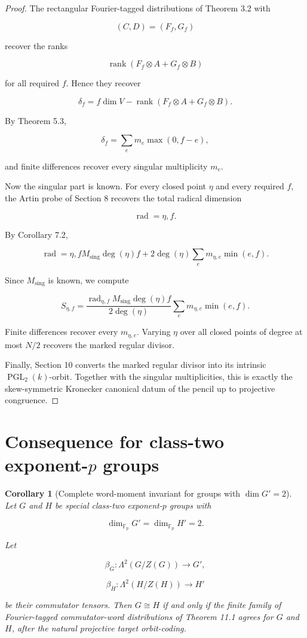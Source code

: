 \documentclass[11pt]{article}
\newtheorem{corollary}[theorem]{Corollary}
\begin{document}
\begin{proof}

The rectangular Fourier-tagged distributions of Theorem 3.2 with

\[
(C,D)=(F_f,G_f)
\]

recover the ranks

\[
\operatorname{rank}(F_f\otimes A+G_f\otimes B)
\]

for all required $f$. Hence they recover

\[
\delta_f
=
f\dim V-\operatorname{rank}(F_f\otimes A+G_f\otimes B).
\]

By Theorem 5.3,

\[
\delta_f=\sum_e m_e\max(0,f-e),
\]

and finite differences recover every singular multiplicity $m_e$.

Now the singular part is known. For every closed point $\eta$ and every required $f$, the Artin probe of Section 8 recovers the total radical dimension

\[
\operatorname{rad}
=
{\eta,f}.
\]

By Corollary 7.2,

\[
\operatorname{rad}
=
{\eta,f}
M_{\mathrm{sing}}\deg(\eta)f
+
2\deg(\eta)\sum_e m_{\eta,e}\min(e,f).
\]

Since $M_{\mathrm{sing}}$ is known, we compute

\[
S_{\eta,f}
=
\frac{
\operatorname{rad}_{\eta,f}
M_{\mathrm{sing}}\deg(\eta)f
}{
2\deg(\eta)
}
\sum_e m_{\eta,e}\min(e,f).
\]

Finite differences recover every $m_{\eta,e}$. Varying $\eta$ over all closed points of degree at most $N/2$ recovers the marked regular divisor.

Finally, Section 10 converts the marked regular divisor into its intrinsic $\operatorname{PGL}_2(k)$-orbit. Together with the singular multiplicities, this is exactly the skew-symmetric Kronecker canonical datum of the pencil up to projective congruence.

\end{proof}

\section{Consequence for class-two exponent-$p$ groups}

\begin{corollary}[Complete word-moment invariant for groups with $\dim G'=2$]

Let $G$ and $H$ be special class-two exponent-$p$ groups with

\[
\dim_{\mathbb F_p}G'=\dim_{\mathbb F_p}H'=2.
\]

Let

\[
\beta_G:\Lambda^2(G/Z(G))\to G',
\]

\[
\beta_H:\Lambda^2(H/Z(H))\to H'
\]

be their commutator tensors. Then $G\cong H$ if and only if the finite family of Fourier-tagged commutator-word distributions of Theorem 11.1 agrees for $G$ and $H$, after the natural projective target orbit-coding.

\end{corollary}
\end{document}
